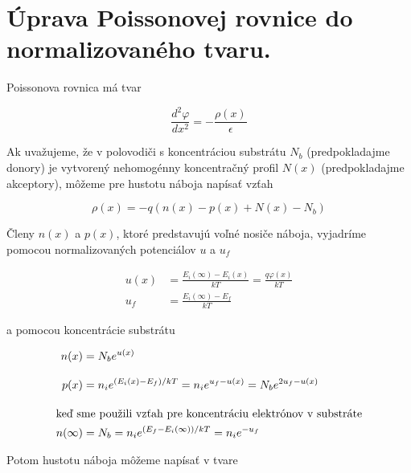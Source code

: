 
\chapter{Úprava Poissonovej rovnice do normalizovaného tvaru.}\label{app:AppendixB}

Poissonova rovnica má tvar

\begin{equation}\label{eq:B.1}
  \frac{d^{2}\varphi}{dx^2} = - \frac{\rho(x)}{\epsilon}
\end{equation}

Ak uvažujeme, že v polovodiči s koncentráciou substrátu $N_b$
(predpokladajme donory) je vytvorený nehomogénny koncentračný profil
$N(x)$ (predpokladajme akceptory), môžeme pre hustotu náboja napísať
vzťah

\begin{equation}\label{eq:B.2}
  \rho(x) = - q (n(x) - p(x) + N(x) -N_b)
\end{equation}

Členy $n(x)$ a $p(x)$, ktoré predstavujú voľné nosiče náboja,
vyjadríme pomocou normalizovaných potenciálov $u$ a $u_f$

\begin{subequations}\label{eq:B.3}
  \begin{align}
    u(x) &= \frac{E_i(\infty) - E_i(x)}{kT} = \frac{q\varphi(x)}{kT} \label{eq:B.3a}\\[0.3cm]
    u_f &= \frac{E_i(\infty) - E_f}{kT} \label{eq:B.3b}
  \end{align}
\end{subequations}

a pomocou koncentrácie substrátu

\begin{subequations}\label{eq:B.4}
  \begin{align}
    n(x) &= N_b {e}^{u(x)}\label{eq:B.4a}\\[0.3cm]
    p(x) &= n_i {e}^{({E_i(x) - E_f})/{kT}} = n_i {e}^{u_f-u(x)} = N_b {e}^{2u_f-u(x)}\label{eq:B.4b}\\[0.3cm]
    \intertext{keď sme použili vzťah pre koncentráciu elektrónov v substráte}
    n(\infty) &= N_b = n_i {e}^{({E_f-E_i(\infty)})/{kT}} = n_i {e}^{-u_f}\label{eq:B.4c}
\end{align}
\end{subequations}

Potom hustotu náboja môžeme napísať v tvare

